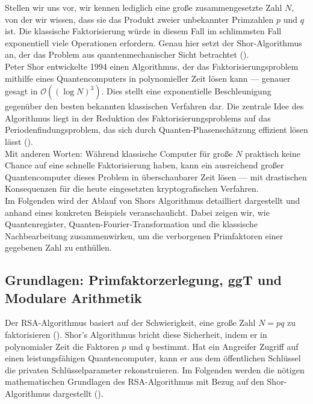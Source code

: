 Stellen wir uns vor, wir kennen lediglich eine große zusammengesetzte Zahl $N$, von der wir wissen, dass sie das Produkt zweier unbekannter Primzahlen $p$ und $q$ ist. Die klassische Faktorisierung würde in diesem Fall im schlimmsten Fall exponentiell viele Operationen erfordern. Genau hier setzt der Shor-Algorithmus an, der das Problem aus quantenmechanischer Sicht betrachtet (\cite{shor_polynomial-time_1994}).\\

Peter Shor entwickelte 1994 einen Algorithmus, der das Faktorisierungsproblem mithilfe eines Quantencomputers in polynomieller Zeit lösen kann — genauer gesagt in $\mathcal{O}((\log N)^3)$. Dies stellt eine exponentielle Beschleunigung gegenüber den besten bekannten klassischen Verfahren dar. Die zentrale Idee des Algorithmus liegt in der Reduktion des Faktorisierungsproblems auf das Periodenfindungsproblem, das sich durch Quanten-Phasenschätzung effizient lösen lässt (\cite{montanaro_quantum_2016}).\\

Mit anderen Worten: Während klassische Computer für große $N$ praktisch keine Chance auf eine schnelle Faktorisierung haben, kann ein ausreichend großer Quantencomputer dieses Problem in überschaubarer Zeit lösen — mit drastischen Konsequenzen für die heute eingesetzten kryptografischen Verfahren.\\

Im Folgenden wird der Ablauf von Shors Algorithmus detailliert dargestellt und anhand eines konkreten Beispiels veranschaulicht. Dabei zeigen wir, wie Quantenregister, Quanten-Fourier-Transformation und die klassische Nachbearbeitung zusammenwirken, um die verborgenen Primfaktoren einer gegebenen Zahl zu enthüllen.\\


\subsection{Grundlagen: Primfaktorzerlegung, ggT und Modulare Arithmetik}
Der RSA-Algorithmus basiert auf der Schwierigkeit, eine große Zahl \( N = pq \) zu faktorisieren (\cite[9-10]{milanov_rsa_2009}). Shor’s Algorithmus bricht diese Sicherheit, indem er in polynomialer Zeit die Faktoren \( p \) und \( q \) bestimmt. Hat ein Angreifer Zugriff auf einen leistungsfähigen Quantencomputer, kann er aus dem öffentlichen Schlüssel die privaten Schlüsselparameter rekonstruieren. Im Folgenden werden die nötigen mathematischen Grundlagen des RSA-Algorithmus mit Bezug auf den Shor-Algorithmus dargestellt (\cite[4-5]{milanov_rsa_2009}).

